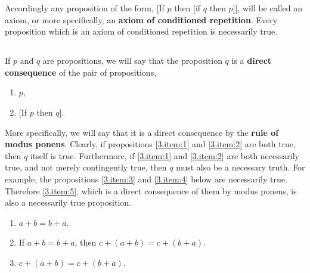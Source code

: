 \documentclass{book}
\begin{document}
Accordingly any proposition of the form, [If \(p\) then [if \(q\) then \(p\)]], will be called an axiom, or more specifically, an \textbf{axiom of conditioned repetition}.  Every proposition which is an axiom of conditioned repetition is necessarily true.

\subsection{}
\label{sec:3.6}

If \(p\) and \(q\) are propositions, we will say that the proposition \(q\) is a \textbf{direct consequence} of the pair of propositions,
\begin{enumerate}[label=(\arabic*),left=2\parindent,topsep=1ex,itemsep=1pt]
\item \label{3.item:1} \(p\),
\item \label{3.item:2} [If \(p\) then \(q\)].
\end{enumerate}
More specifically, we will say that it is a direct consequence by the \textbf{rule of modus ponens}.  Clearly, if propositions \ref{3.item:1} and \ref{3.item:2} are both true, then \(q\) itself is true.  Furthermore, if \ref{3.item:1} and \ref{3.item:2} are both necessarily true, and not merely contingently true, then \(q\) must also be a necessary truth.  For example, the propositions \ref{3.item:3} and \ref{3.item:4} below are necessarily true.  Therefore \ref{3.item:5}, which is a direct consequence of them by modus ponens, is also a necessarily true proposition.
\begin{enumerate}[resume*]
\item \label{3.item:3} \(a + b = b + a\).
\item \label{3.item:4} If \(a + b = b + a\), then \(c + (a + b) = c + (b + a)\).
\item \label{3.item:5} \(c + (a + b) = c + (b + a)\).
\end{enumerate}

\subsection{}
\label{sec:3.7}
\end{document}
